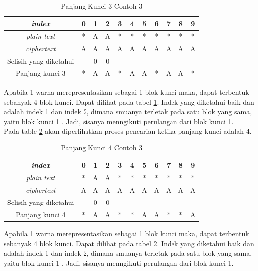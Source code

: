 	\begin{table}[H]
	 	\centering
	 	\setlength{\arrayrulewidth}{.08em}
	 	\begin{tabular}{|c|c|c|c|c|c|c|c|c|c|c|}\hline
	 	\textit{index}&0&1&2&3&4&5&6&7&8&9\\ \hline
	 	\textit{plain text}&\cellcolor{blue!15}*&\cellcolor{blue!15}A&\cellcolor{blue!15}A&\cellcolor{blue!15}*&\cellcolor{green!15}*&\cellcolor{green!15}*&\cellcolor{green!15}*&\cellcolor{green!15}*&\cellcolor{violet!30}*&\cellcolor{violet!30}*\\ \hline
	 	\textit{ciphertext}&\cellcolor{blue!15}A&\cellcolor{blue!15}A&\cellcolor{blue!15}A&\cellcolor{blue!15}A&\cellcolor{green!15}A&\cellcolor{green!15}A&\cellcolor{green!15}A&\cellcolor{green!15}A&\cellcolor{violet!30}A&\cellcolor{violet!30}A\\ \hline
		Selisih yang diketahui & &0&0& & & & & & & \\ \hline	
		Panjang kunci 3 &*&A&A&*&A&A&*&A&A&*\\ \hline 	
	 	\end{tabular}
	 	\caption{Panjang Kunci 3 Contoh 3}
	 	\label{tab:k3contoh3}
	\end{table}
	Apabila 1 warna merepresentasikan sebagai 1 blok kunci maka, dapat terbentuk sebanyak 4 blok kunci. Dapat dilihat pada tabel \ref{tab:k3contoh3}. Indek yang diketahui baik \plaintext dan \ciphertext adalah indek 1 dan indek 2, dimana smuanya terletak pada satu blok yang sama, yaitu blok kunci 1 . Jadi, sisanya menngikuti perulangan dari blok kunci 1. 
	\\
	Pada table \ref{tab:k4contoh3} akan diperlihatkan proses pencarian ketika panjang kunci adalah 4.
	\begin{table}[H]
	 	\centering
	 	\setlength{\arrayrulewidth}{.08em}
	 	\begin{tabular}{|c|c|c|c|c|c|c|c|c|c|c|}\hline
	 	\textit{index}&0&1&2&3&4&5&6&7&8&9\\ \hline
	 	\textit{plain text}&\cellcolor{blue!15}*&\cellcolor{blue!15}A&\cellcolor{blue!15}A&\cellcolor{green!15}*&\cellcolor{green!15}*&\cellcolor{green!15}*&\cellcolor{violet!30}*&\cellcolor{violet!30}*&\cellcolor{violet!30}*&\cellcolor{purple!25}*\\ \hline
	 	\textit{ciphertext}&\cellcolor{blue!15}A&\cellcolor{blue!15}A&\cellcolor{blue!15}A&\cellcolor{green!15}A&\cellcolor{green!15}A&\cellcolor{green!15}A&\cellcolor{violet!30}A&\cellcolor{violet!30}A&\cellcolor{violet!30}A&\cellcolor{purple!25}A\\ \hline
		Selisih yang diketahui & &0&0& & & & & & & \\ \hline	
		Panjang kunci 4 &*&A&A&*&*&A&A&*&*&A\\ \hline 	
	 	\end{tabular}
	 	\caption{Panjang Kunci 4 Contoh 3}
	 	\label{tab:k4contoh3}
	\end{table}
	Apabila 1 warna merepresentasikan sebagai 1 blok kunci maka, dapat terbentuk sebanyak 4 blok kunci. Dapat dilihat pada tabel \ref{tab:k4contoh3}. Indek yang diketahui baik \plaintext dan \ciphertext adalah indek 1 dan indek 2, dimana smuanya terletak pada satu blok yang sama, yaitu blok kunci 1 . Jadi, sisanya menngikuti perulangan dari blok kunci 1. 
	
